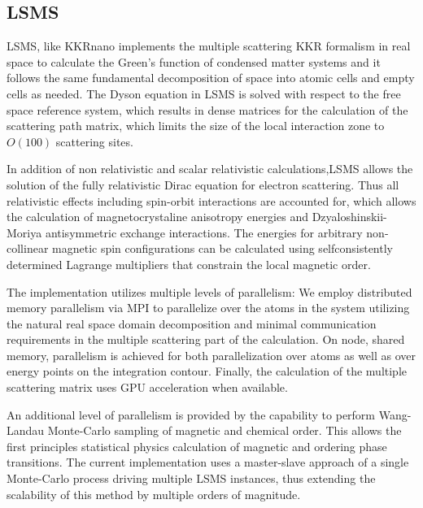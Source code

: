 \documentclass{llncs}
\def\KKRnano{{KKRnano}}
\def\LSMS{{LSMS}}
\begin{document}
\subsection{LSMS} \label{section:lsms}

\LSMS{}\cite{Wang1995}, like \KKRnano{} implements the multiple
scattering KKR formalism in real space to calculate the Green's
function of condensed matter systems and it follows the same
fundamental decomposition of space into atomic cells and empty cells
as needed. The Dyson equation in \LSMS{} is solved with respect to the
free space reference system, which results in dense matrices for the
calculation of the scattering path matrix, which limits the size of
the local interaction zone to $O(100)$ scattering sites.

In addition of non relativistic and scalar relativistic
calculations,\LSMS{} allows the solution of the fully relativistic
Dirac equation for electron scattering. Thus all relativistic effects
including spin-orbit interactions are accounted for, which allows the
calculation of magnetocrystaline anisotropy energies and
Dzyaloshinskii-Moriya antisymmetric exchange interactions. The
energies for arbitrary non-collinear magnetic spin configurations can
be calculated using selfconsistently determined Lagrange multipliers
that constrain the local magnetic order. 

The implementation utilizes multiple levels of parallelism: We employ
distributed memory parallelism via MPI to parallelize over the atoms
in the system utilizing the natural real space domain decomposition
and minimal communication requirements in the multiple scattering part
of the calculation. On node, shared memory, parallelism is achieved
for both parallelization over atoms as well as over energy points on
the integration contour. Finally, the calculation of the multiple
scattering matrix uses GPU acceleration when available.  

An additional level of parallelism is provided by the capability to
perform Wang-Landau Monte-Carlo sampling of magnetic and chemical
order. This allows the first principles statistical physics
calculation of magnetic and ordering phase transitions. The current
implementation uses a master-slave approach of a single Monte-Carlo
process driving multiple \LSMS{} instances, thus extending the
scalability of this method by multiple orders of magnitude.
\end{document}
